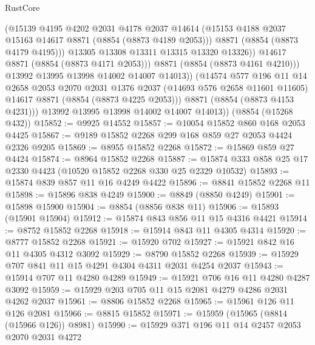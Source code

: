 \begin{lexlean}{RustCore}
\begin{coremodule}
                      (@15139
                        @4195
                        @4202
                        @2031
                        @4178
                        @2037
                        @14614
                        (@15153 @4188 @2037 @15163 @14617 @8871 (@8854 (@8873 @4189 @2053)))
                        @8871
                        (@8854 (@8873 @4179 @4195)))
                      @13305
                      @13308
                      @13311
                      @13315
                      @13320
                      @13326))
                  @14617
                  @8871
                  (@8854 (@8873 @4171 @2053)))
                @8871
                (@8854 (@8873 @4161 @4210)))
              @13992
              @13995
              @13998
              @14002
              @14007
              @14013))
          (@14574
            @577
            @196
            @11
            @14
            @2658
            @2053
            @2070
            @2031
            @1376
            @2037
            (@14693 @576 @2658 @11601 @11605)
            @14617
            @8871
            (@8854 (@8873 @4225 @2053)))
          @8871
          (@8854 (@8873 @4153 @4231)))
        @13992
        @13995
        @13998
        @14002
        @14007
        @14013))
    (@8854 (@15268 @432))
@15852 := @9925 @14552
@15857 := @10054 @15852 @860 @168 @2053 @4425
@15867 := @9189 @15852 @2268 @299 @168 @859 @27 @2053 @4424 @2326 @9205
@15869 := @8955 @15852 @2268
@15872 := @15869 @859 @27 @4424
@15874 := @8964 @15852 @2268
@15887 := @15874 @333 @858 @25 @17 @2330 @4423 (@10520 @15852 @2268 @330 @25 @2329 @10532)
@15893 := @15874 @839 @857 @11 @16 @4249 @4422
@15896 := @8841 @15852 @2268 @11
@15898 := @15896 @838 @4249
@15900 := @8849 (@8850 @4249)
@15901 := @15898 @15900
@15904 := @8854 (@8856 @838 @11)
@15906 := @15893 (@15901 @15904)
@15912 := @15874 @843 @856 @11 @15 @4316 @4421
@15914 := @8752 @15852 @2268
@15918 := @15914 @843 @11 @4305 @4314
@15920 := @8777 @15852 @2268
@15921 := @15920 @702
@15927 := @15921 @842 @16 @11 @4305 @4312 @3092
@15929 := @8790 @15852 @2268
@15939 := @15929 @707 @841 @11 @15 @4291 @4304 @4311 @2031 @4254 @2037
@15943 := @15914 @707 @11 @4280 @4289
@15949 := @15921 @706 @16 @11 @4280 @4287 @3092
@15959 := @15929 @203 @705 @11 @15 @2081 @4279 @4286 @2031 @4262 @2037
@15961 := @8806 @15852 @2268
@15965 := @15961 @126 @11 @126 @2081
@15966 := @8815 @15852
@15971 := @15959 (@15965 (@8814 (@15966 @126)) @8981)
@15990 := @15929
    @371
    @196
    @11
    @14
    @2457
    @2053
    @2070
    @2031
    @4272

\end{coremodule}
\end{lexlean}
